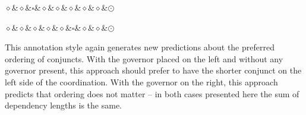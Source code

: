 \begin{multicols}{2}
\begin{exe}
\begin{xlist}
\ex
\begin{dependency}[theme = simple, baseline=-\the\dimexpr\fontdimen22\textfont2\relax]
    \begin{deptext}
        $\diamond$\&$\diamond$\&$\square$\&$\diamond$\&$\diamond$\&$\diamond$\&$\diamond$\&$\diamond$\&$\odot$\\
    \end{deptext}
\end{dependency}

\ex
\begin{dependency}[theme = simple, baseline=-\the\dimexpr\fontdimen22\textfont2\relax]
    \begin{deptext}
        $\diamond$\&$\diamond$\&$\diamond$\&$\diamond$\&$\diamond$\&$\square$\&$\diamond$\&$\diamond$\&$\odot$\\
    \end{deptext}
\end{dependency}
\end{xlist}
\end{exe}
\end{multicols}

This annotation style again generates new predictions about the preferred ordering of conjuncts. With the governor placed on the left and without any governor present, this approach should prefer to have the shorter conjunct on the left side of the coordination. With the governor on the right, this approach predicts that ordering does not matter -- in both cases presented here the sum of dependency lengths is the same. 
